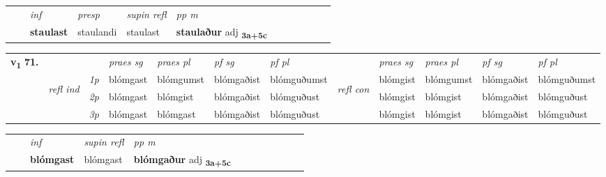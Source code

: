 \begin{tabular}{llllllllllll}
 & & \textit{inf}     & \textit{presp}  & \textit{supin refl} & \textit{pp m}     \\*
  & & \textbf{staulast}      & staulandi  & staulast & \textbf{staulaður} adj \textbf{\textsubscript{3a+5c}} \\*
\cmidrule{1-12}
\end{tabular}



\begin{tabular}{llllllllllll} \toprule
\multirow{4}{*}{{{\textbf{v{\textsubscript{1}}} \Large{\textbf{71.}}}}}  & &   &  \textit{praes sg}  & \textit{praes pl}  &\textit{pf sg} & \textit{pf pl} &  &  \textit{praes sg}  & \textit{praes pl}  & \textit{pf sg} & \textit{pf pl } \\*
	\cmidrule{4-7} \cmidrule{9-12}
 &\multirow{3}{*}{\begin{turn}{90}\textit{refl ind}\end{turn}} & {\textit{1p}} & blómgast & blómgumst    & blómgaðist & blómguðumst & \multirow{3}{*}{\begin{turn}{90}\textit{refl con}\end{turn}}  &blómgist & blómgumst & blómgaðist & blómguðumst\\*
 &&  {\textit{2p}} &  blómgast  & blómgist   & blómgaðist & blómguðust & &blómgist & blómgist & blómgaðist & blómguðust \\*
& &  {\textit{3p}} & blómgast & blómgast   & blómgaðist & blómguðust & & blómgist & blómgist& blómgaðist & blómguðust  \\*
\cmidrule{4-7} \cmidrule{9-12}
\end{tabular}


\begin{tabular}{llllllllllll}
 & & \textit{inf}       & \textit{supin refl} & \textit{pp m}     \\*
  & & \textbf{blómgast}        & blómgast & \textbf{blómgaður} adj \textbf{\textsubscript{3a+5c}} \\*
\cmidrule{1-12}
\end{tabular}




